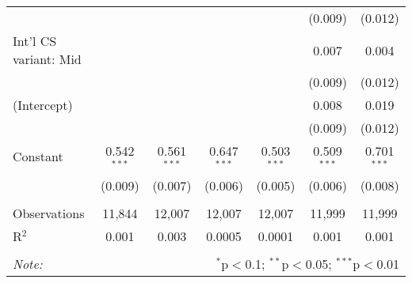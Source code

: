 \begin{tabular}{@{\extracolsep{5pt}}lcccccc}
  &  &  &  &  & (0.009) & (0.012) \\ 
  Int'l CS variant: Mid &  &  &  &  & 0.007 & 0.004 \\ 
  &  &  &  &  & (0.009) & (0.012) \\ 
  (Intercept) &  &  &  &  & 0.008 & 0.019 \\ 
  &  &  &  &  & (0.009) & (0.012) \\ 
  Constant & 0.542$^{***}$ & 0.561$^{***}$ & 0.647$^{***}$ & 0.503$^{***}$ & 0.509$^{***}$ & 0.701$^{***}$ \\ 
  & (0.009) & (0.007) & (0.006) & (0.005) & (0.006) & (0.008) \\ 
 \hline \\[-1.8ex] 
Observations & 11,844 & 12,007 & 12,007 & 12,007 & 11,999 & 11,999 \\ 
R$^{2}$ & 0.001 & 0.003 & 0.0005 & 0.0001 & 0.001 & 0.001 \\ 
\hline 
\hline \\[-1.8ex] 
\textit{Note:}  & \multicolumn{6}{r}{$^{*}$p$<$0.1; $^{**}$p$<$0.05; $^{***}$p$<$0.01} \\ 
\end{tabular} 
